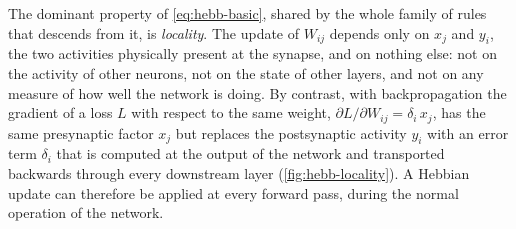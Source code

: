 The dominant property of \eqref{eq:hebb-basic}, shared by the whole family of rules that descends from it, is \emph{locality}. The update of $W_{ij}$ depends only on $x_j$ and $y_i$, the two activities physically present at the synapse, and on nothing else: not on the activity of other neurons, not on the state of other layers, and not on any measure of how well the network is doing. By contrast, with backpropagation the gradient of a loss $L$ with respect to the same weight, $\partial L / \partial W_{ij} = \delta_i\, x_j$, has the same presynaptic factor $x_j$ but replaces the postsynaptic activity $y_i$ with an error term $\delta_i$ that is computed at the output of the network and transported backwards through every downstream layer (\autoref{fig:hebb-locality}). A Hebbian update can therefore be applied at every forward pass, during the normal operation of the network.

